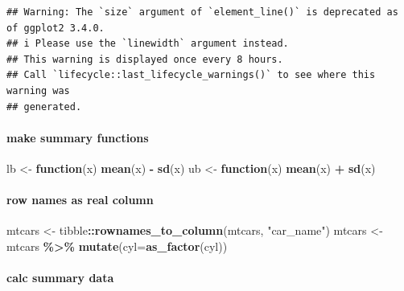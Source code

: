 \documentclass[
]{article}
\newenvironment{Shaded}{\begin{snugshade}}{\end{snugshade}}
\newcommand{\AttributeTok}[1]{\textcolor[rgb]{0.13,0.29,0.53}{#1}}
\newcommand{\ControlFlowTok}[1]{\textcolor[rgb]{0.13,0.29,0.53}{\textbf{#1}}}
\newcommand{\FunctionTok}[1]{\textcolor[rgb]{0.13,0.29,0.53}{\textbf{#1}}}
\newcommand{\NormalTok}[1]{#1}
\newcommand{\OtherTok}[1]{\textcolor[rgb]{0.56,0.35,0.01}{#1}}
\newcommand{\SpecialCharTok}[1]{\textcolor[rgb]{0.81,0.36,0.00}{\textbf{#1}}}
\newcommand{\StringTok}[1]{\textcolor[rgb]{0.31,0.60,0.02}{#1}}
\begin{document}
\begin{verbatim}
## Warning: The `size` argument of `element_line()` is deprecated as of ggplot2 3.4.0.
## i Please use the `linewidth` argument instead.
## This warning is displayed once every 8 hours.
## Call `lifecycle::last_lifecycle_warnings()` to see where this warning was
## generated.
\end{verbatim}

\hypertarget{make-summary-functions}{%
\paragraph{make summary functions}\label{make-summary-functions}}

\begin{Shaded}
\begin{Highlighting}[]
\NormalTok{lb }\OtherTok{\textless{}{-}} \ControlFlowTok{function}\NormalTok{(x) }\FunctionTok{mean}\NormalTok{(x) }\SpecialCharTok{{-}} \FunctionTok{sd}\NormalTok{(x)}
\NormalTok{ub }\OtherTok{\textless{}{-}} \ControlFlowTok{function}\NormalTok{(x) }\FunctionTok{mean}\NormalTok{(x) }\SpecialCharTok{+} \FunctionTok{sd}\NormalTok{(x)}
\end{Highlighting}
\end{Shaded}

\hypertarget{row-names-as-real-column}{%
\paragraph{row names as real column}\label{row-names-as-real-column}}

\begin{Shaded}
\begin{Highlighting}[]
\NormalTok{mtcars }\OtherTok{\textless{}{-}}\NormalTok{ tibble}\SpecialCharTok{::}\FunctionTok{rownames\_to\_column}\NormalTok{(mtcars, }\StringTok{"car\_name"}\NormalTok{)}
\NormalTok{mtcars }\OtherTok{\textless{}{-}}\NormalTok{ mtcars }\SpecialCharTok{\%\textgreater{}\%} \FunctionTok{mutate}\NormalTok{(}\AttributeTok{cyl=}\FunctionTok{as\_factor}\NormalTok{(cyl))}
\end{Highlighting}
\end{Shaded}

\hypertarget{calc-summary-data}{%
\paragraph{calc summary data}\label{calc-summary-data}}
\end{document}
